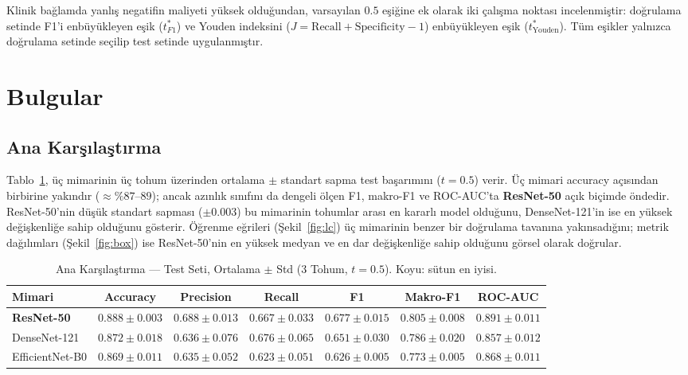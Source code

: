 \documentclass[conference]{IEEEtran}
\begin{document}
Klinik bağlamda yanlış negatifin maliyeti yüksek olduğundan, varsayılan $0.5$ eşiğine ek olarak iki çalışma noktası incelenmiştir: doğrulama setinde F1'i enbüyükleyen eşik ($t^{*}_{F1}$) ve Youden indeksini ($J = \text{Recall} + \text{Specificity} - 1$) enbüyükleyen eşik ($t^{*}_{\text{Youden}}$). Tüm eşikler yalnızca doğrulama setinde seçilip test setinde uygulanmıştır.

\section{Bulgular}
\subsection{Ana Karşılaştırma}
Tablo~\ref{tab:main}, üç mimarinin üç tohum üzerinden ortalama $\pm$ standart sapma test başarımını ($t = 0.5$) verir. Üç mimari accuracy açısından birbirine yakındır ($\approx \%87$--$89$); ancak azınlık sınıfını da dengeli ölçen F1, makro-F1 ve ROC-AUC'ta \textbf{ResNet-50} açık biçimde öndedir. ResNet-50'nin düşük standart sapması ($\pm 0.003$) bu mimarinin tohumlar arası en kararlı model olduğunu, DenseNet-121'in ise en yüksek değişkenliğe sahip olduğunu gösterir. Öğrenme eğrileri (Şekil~\ref{fig:lc}) üç mimarinin benzer bir doğrulama tavanına yakınsadığını; metrik dağılımları (Şekil~\ref{fig:box}) ise ResNet-50'nin en yüksek medyan ve en dar değişkenliğe sahip olduğunu görsel olarak doğrular.

\begin{table}[t]
\caption{Ana Karşılaştırma --- Test Seti, Ortalama $\pm$ Std (3 Tohum, $t = 0.5$). Koyu: sütun en iyisi.}
\label{tab:main}
\centering
\begin{tabular}{lcccccc}
\toprule
\textbf{Mimari} & \textbf{Accuracy} & \textbf{Precision} & \textbf{Recall} & \textbf{F1} & \textbf{Makro-F1} & \textbf{ROC-AUC} \\
\midrule
\textbf{ResNet-50}    & $\mathbf{0.888 \pm 0.003}$ & $\mathbf{0.688 \pm 0.013}$ & $0.667 \pm 0.033$ & $\mathbf{0.677 \pm 0.015}$ & $\mathbf{0.805 \pm 0.008}$ & $\mathbf{0.891 \pm 0.011}$ \\
DenseNet-121          & $0.872 \pm 0.018$ & $0.636 \pm 0.076$ & $\mathbf{0.676 \pm 0.065}$ & $0.651 \pm 0.030$ & $0.786 \pm 0.020$ & $0.857 \pm 0.012$ \\
EfficientNet-B0       & $0.869 \pm 0.011$ & $0.635 \pm 0.052$ & $0.623 \pm 0.051$ & $0.626 \pm 0.005$ & $0.773 \pm 0.005$ & $0.868 \pm 0.011$ \\
\bottomrule
\end{tabular}
\end{table}
\end{document}
